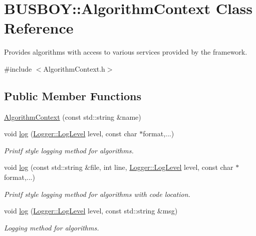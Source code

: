 \hypertarget{classBUSBOY_1_1AlgorithmContext}{
\section{BUSBOY::AlgorithmContext Class Reference}
\label{classBUSBOY_1_1AlgorithmContext}
}


Provides algorithms with access to various services provided by the framework.  


{\ttfamily \#include $<$AlgorithmContext.h$>$}\subsection*{Public Member Functions}
\begin{DoxyCompactItemize}
\item 
\hyperlink{classBUSBOY_1_1AlgorithmContext_a9f280b865d71a0b4fb5c8070f79c1df4}{AlgorithmContext} (const std::string \&name)
\item 
void \hyperlink{classBUSBOY_1_1AlgorithmContext_ad34588d7242c99541351256fff32a352}{log} (\hyperlink{classBUSBOY_1_1Logger_ac674cbb789eaa29c338c66248a4e4234}{Logger::LogLevel} level, const char $\ast$format,...)
\begin{DoxyCompactList}\small\item\em Printf style logging method for algorithms. \item\end{DoxyCompactList}\item 
void \hyperlink{classBUSBOY_1_1AlgorithmContext_a9c7487e4a8e36878e06ceff4f15d69f4}{log} (const std::string \&file, int line, \hyperlink{classBUSBOY_1_1Logger_ac674cbb789eaa29c338c66248a4e4234}{Logger::LogLevel} level, const char $\ast$format,...)
\begin{DoxyCompactList}\small\item\em Printf style logging method for algorithms with code location. \item\end{DoxyCompactList}\item 
void \hyperlink{classBUSBOY_1_1AlgorithmContext_abbec3e4f56f5789e78a965bb34740273}{log} (\hyperlink{classBUSBOY_1_1Logger_ac674cbb789eaa29c338c66248a4e4234}{Logger::LogLevel} level, const std::string \&msg)
\begin{DoxyCompactList}\small\item\em Logging method for algorithms. \item\end{DoxyCompactList}\item 

\end{DoxyCompactItemize}
